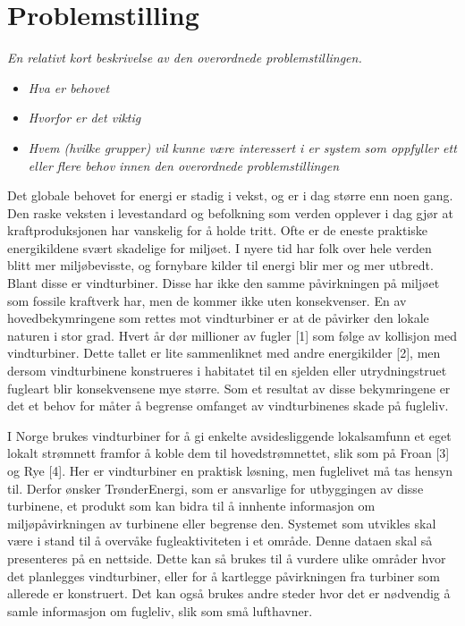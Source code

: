 \section{Problemstilling}
\label{sec:problemstilling}
\textit{En relativt kort beskrivelse av den overordnede problemstillingen.}
\begin{itemize}
\item \textit{Hva er behovet}
\item \textit{Hvorfor er det viktig}
\item \textit{Hvem (hvilke grupper) vil kunne være interessert i er system som oppfyller ett eller flere behov innen den overordnede problemstillingen}
\end{itemize}


Det globale behovet for energi er stadig i vekst, og er i dag større enn noen gang. Den raske veksten i levestandard og befolkning som verden opplever i dag gjør at kraftproduksjonen har vanskelig for å holde tritt. Ofte er de eneste praktiske energikildene svært skadelige for miljøet. I nyere tid har folk over hele verden blitt mer miljøbevisste, og fornybare kilder til energi blir mer og mer utbredt. Blant disse er vindturbiner. Disse har ikke den samme påvirkningen på miljøet som fossile kraftverk har, men de kommer ikke uten konsekvenser. En av hovedbekymringene som rettes mot vindturbiner er at de påvirker den lokale naturen i stor grad. Hvert år dør millioner av fugler [1] som følge av kollisjon med vindturbiner. Dette tallet er lite sammenliknet med andre energikilder [2], men dersom vindturbinene konstrueres i habitatet til en sjelden eller utrydningstruet fugleart blir konsekvensene mye større. Som et resultat av disse bekymringene er det et behov for måter å begrense omfanget av vindturbinenes skade på fugleliv.

I Norge brukes vindturbiner for å gi enkelte avsidesliggende lokalsamfunn et eget lokalt strømnett framfor å koble dem til hovedstrømnettet, slik som på Froan [3] og Rye [4]. Her er vindturbiner en praktisk løsning, men fuglelivet må tas hensyn til. Derfor ønsker TrønderEnergi, som er ansvarlige for utbyggingen av disse turbinene, et produkt som kan bidra til å innhente informasjon om miljøpåvirkningen av turbinene eller begrense den. Systemet som utvikles skal være i stand til å overvåke fugleaktiviteten i et område. Denne dataen skal så presenteres på en nettside. Dette kan så brukes til å vurdere ulike områder hvor det planlegges vindturbiner, eller for å kartlegge påvirkningen fra turbiner som allerede er konstruert. Det kan også brukes andre steder hvor det er nødvendig å samle informasjon om fugleliv, slik som små lufthavner.

